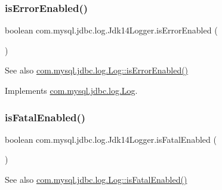 \mbox{\label{classcom_1_1mysql_1_1jdbc_1_1log_1_1_jdk14_logger_af21aea05fb62e1895801a086bf33c2f6}} 
\subsubsection{\texorpdfstring{is\+Error\+Enabled()}{isErrorEnabled()}}
{\footnotesize\ttfamily boolean com.\+mysql.\+jdbc.\+log.\+Jdk14\+Logger.\+is\+Error\+Enabled (\begin{DoxyParamCaption}{ }\end{DoxyParamCaption})}

\begin{DoxySeeAlso}{See also}
\mbox{\hyperlink{interfacecom_1_1mysql_1_1jdbc_1_1log_1_1_log_aece1d483e86ea84bd1553ed993c56c59}{com.\+mysql.\+jdbc.\+log.\+Log\+::is\+Error\+Enabled()}} 
\end{DoxySeeAlso}


Implements \mbox{\hyperlink{interfacecom_1_1mysql_1_1jdbc_1_1log_1_1_log_aece1d483e86ea84bd1553ed993c56c59}{com.\+mysql.\+jdbc.\+log.\+Log}}.

\mbox{\label{classcom_1_1mysql_1_1jdbc_1_1log_1_1_jdk14_logger_a3cf7110392bc00771a85b3e99b8841af}} 
\subsubsection{\texorpdfstring{is\+Fatal\+Enabled()}{isFatalEnabled()}}
{\footnotesize\ttfamily boolean com.\+mysql.\+jdbc.\+log.\+Jdk14\+Logger.\+is\+Fatal\+Enabled (\begin{DoxyParamCaption}{ }\end{DoxyParamCaption})}

\begin{DoxySeeAlso}{See also}
\mbox{\hyperlink{interfacecom_1_1mysql_1_1jdbc_1_1log_1_1_log_acc3f527d8a1e3143e312eb4368c3632a}{com.\+mysql.\+jdbc.\+log.\+Log\+::is\+Fatal\+Enabled()}} 
\end{DoxySeeAlso}


